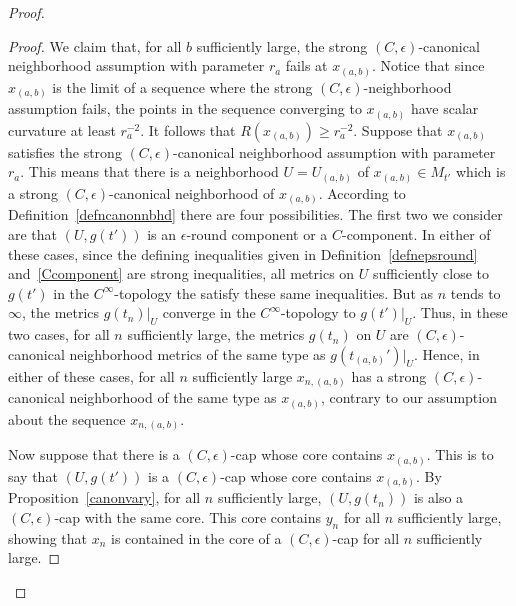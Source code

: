 \begin{proof}
\begin{proof}
 We claim that, for
all $b$ sufficiently large, the strong $(C,\epsilon)$-canonical neighborhood assumption
with parameter $r_a$ fails at $x_{(a,b)}$. Notice that since $x_{(a,b)}$
is the limit of a sequence where the strong
$(C,\epsilon)$-neighborhood assumption fails, the points in the
sequence converging to $x_{(a,b)}$ have scalar curvature at least
$r_a^{-2}$. It follows that $R(x_{(a,b)})\ge r_a^{-2}$.  Suppose
that $x_{(a,b)}$ satisfies the strong $(C,\epsilon)$-canonical
neighborhood assumption with parameter $r_a$. This means that there
is a neighborhood $U=U_{(a,b)}$ of $x_{(a,b)}\in M_{t'}$
which is a strong $(C,\epsilon)$-canonical neighborhood of
$x_{(a,b)}$. According to Definition~\ref{defncanonnbhd} there are
four possibilities. The first two we consider are that $(U,g(t'))$
is an $\epsilon$-round component or a $C$-component. In either of
these cases, since the defining inequalities given in
Definition~\ref{defnepsround} and~\ref{Ccomponent} are strong
inequalities,  all metrics on $U$ sufficiently close to $g(t')$
in the $C^\infty$-topology the satisfy these same inequalities. But as $n$ tends to
$\infty$, the metrics $g(t_n)|_U$ converge in the $C^\infty$-topology
to $g(t')|_U$. Thus, in these two cases, for all $n$ sufficiently
large, the metrics $g(t_n)$ on $U$ are $(C,\epsilon)$-canonical
neighborhood metrics of the same type as $g(t_{(a,b)}')|_U$. Hence, in
either of these cases, for all $n$ sufficiently large $x_{n,(a,b)}$
has a strong $(C,\epsilon)$-canonical neighborhood of the same type
as $x_{(a,b)}$, contrary to our assumption about the sequence
$x_{n,(a,b)}$.



Now suppose that there is
 a $(C,\epsilon)$-cap whose core contains $x_{(a,b)}$.
This is to say that $(U,g(t'))$ is a $(C,\epsilon)$-cap whose core
contains $x_{(a,b)}$. By Proposition~\ref{canonvary}, for all $n$
sufficiently large, $(U,g(t_{n}))$ is also a $(C,\epsilon)$-cap with
the same core. This core contains $y_{n}$ for all $n$ sufficiently
large, showing that $x_{n}$ is contained in the core of a
$(C,\epsilon)$-cap  for all $n$ sufficiently large.



\end{proof}
\end{proof}
